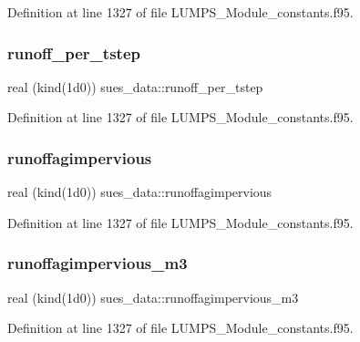 Definition at line 1327 of file L\+U\+M\+P\+S\+\_\+\+Module\+\_\+constants.\+f95.

\mbox{\label{namespacesues__data_a15eb03975ee429099b923fc02a2577ca}} 
\subsubsection{\texorpdfstring{runoff\+\_\+per\+\_\+tstep}{runoff\_per\_tstep}}
{\footnotesize\ttfamily real (kind(1d0)) sues\+\_\+data\+::runoff\+\_\+per\+\_\+tstep}



Definition at line 1327 of file L\+U\+M\+P\+S\+\_\+\+Module\+\_\+constants.\+f95.

\mbox{\label{namespacesues__data_ac376fe6389c7367c307fce12d816009c}} 
\subsubsection{\texorpdfstring{runoffagimpervious}{runoffagimpervious}}
{\footnotesize\ttfamily real (kind(1d0)) sues\+\_\+data\+::runoffagimpervious}



Definition at line 1327 of file L\+U\+M\+P\+S\+\_\+\+Module\+\_\+constants.\+f95.

\mbox{\label{namespacesues__data_a56bf7a98188b09dfcd2c9daed991f1b0}} 
\subsubsection{\texorpdfstring{runoffagimpervious\+\_\+m3}{runoffagimpervious\_m3}}
{\footnotesize\ttfamily real (kind(1d0)) sues\+\_\+data\+::runoffagimpervious\+\_\+m3}



Definition at line 1327 of file L\+U\+M\+P\+S\+\_\+\+Module\+\_\+constants.\+f95.

